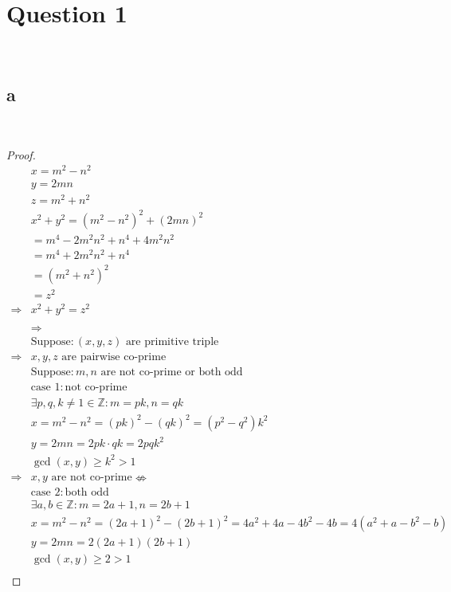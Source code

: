 \documentclass{article}
\begin{document}
\section*{Question 1}

~

\subsection*{a}

~

\begin{proof}
    \begin{align*}
        &x=m^2-n^2\\
        &y=2mn\\
        &z=m^2+n^2\\
        &x^2+y^2=(m^2-n^2)^2+(2mn)^2\\
        &=m^4-2m^2n^2+n^4+4m^2n^2\\
        &=m^4+2m^2n^2+n^4\\
        &=(m^2+n^2)^2\\
        &=z^2\\
        \Rightarrow&x^2+y^2=z^2\\
        &\\
        &\Rightarrow\\
        &\text{Suppose}:(x,y,z)\text{ are primitive triple}\\
        \Rightarrow&x,y,z\text{ are pairwise co-prime}\\
        &\text{Suppose}: m,n\text{ are not co-prime or both odd}\\
        &\text{case }1:\text{not co-prime}\\
        &\exists p,q,k\ne1\in\mathbb{Z}:m=pk,n=qk\\
        &x=m^2-n^2=(pk)^2-(qk)^2=(p^2-q^2)k^2\\
        &y=2mn=2pk\cdot qk=2pqk^2\\
        &\gcd(x,y)\geqslant k^2>1\\
        \Rightarrow&x,y\text{ are not co-prime}\nLeftrightarrow\\
        &\text{case }2:\text{both odd}\\
        &\exists a,b\in\mathbb{Z}:m=2a+1,n=2b+1\\
        &x=m^2-n^2=(2a+1)^2-(2b+1)^2=4a^2+4a-4b^2-4b=4(a^2+a-b^2-b)\\
        &y=2mn=2(2a+1)(2b+1)\\
        &\gcd(x,y)\geqslant 2>1\\

\end{align*}
\end{proof}
\end{document}

